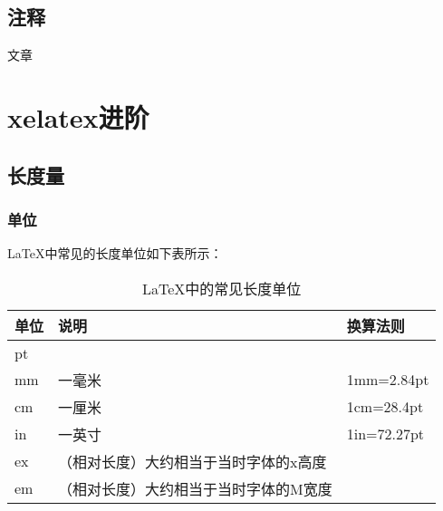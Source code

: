 \documentclass[11pt,oneside]{book}
\begin{document}
      \chapter{注释}
      文章\showendnotes







      \part{xelatex进阶}
      \chapter{长度量}

      \section{单位}
      \LaTeX{}中常见的长度单位如下表所示：
      \begin{table}[H]
        \centering
        \label{tab:LaTeX中的常见长度单位}
        \caption{\LaTeX{}中的常见长度单位}
        \medskip
        \begin{tabular}{@{}lll@{}}
          \toprule
          单位 & 说明 & 换算法则 \\ \midrule
          pt  &   &\\
          mm  & 一毫米  & 1mm=2.84pt \\
          cm  &  一厘米  &  1cm=28.4pt \\
          in  &  一英寸 & 1in=72.27pt \\
          ex  &  （相对长度）大约相当于当时字体的x高度 & \\
          em  & （相对长度）大约相当于当时字体的M宽度 & \\ \bottomrule
        \end{tabular}
      \end{table}
\end{document}
